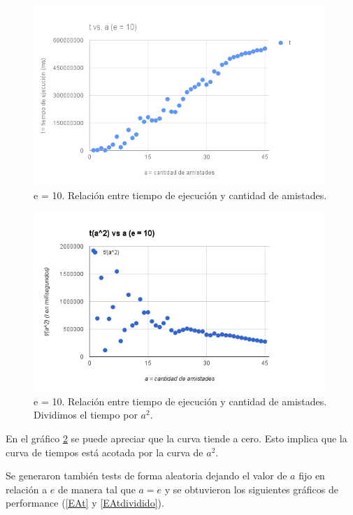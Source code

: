  \begin{figure}[h!]
   \begin{center}
 	\includegraphics[width=11cm]{imagenes/ej3/Efijo-t.png}
	\caption{e = 10. Relación entre tiempo de ejecución y cantidad de amistades.}
	\label{Efijot}
   \end{center}
 \end{figure}
 
 \begin{figure}[h!]
   \begin{center}
 	\includegraphics[width=11cm]{imagenes/ej3/Efijo-tdividido.png}
	\caption{e = 10. Relación entre tiempo de ejecución y cantidad de amistades. Dividimos el tiempo por $a^2$.}
	\label{Efijotdividido}
   \end{center}
 \end{figure}

En el gráfico \ref{Efijotdividido} se puede apreciar que la curva tiende a cero. Esto implica que la curva de tiempos está acotada por la curva de $a^2$.


Se generaron también tests de forma aleatoria dejando el valor de $a$ fijo en relación a $e$ de manera tal que $a = e$ y se obtuvieron los siguientes gráficos de performance (\ref{EAt} y \ref{EAtdividido}).

